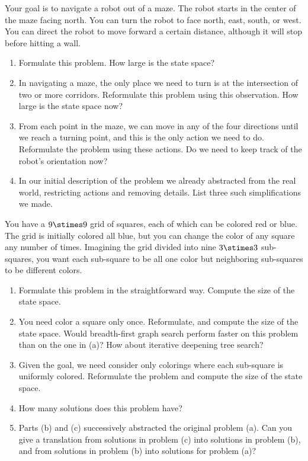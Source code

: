 \begin{uexercise}%
Your goal is to navigate a robot out of a maze.  The robot starts in
the center of the maze facing north.  You can turn the robot to face
north, east, south, or west.  You can direct the robot to move forward
a certain distance, although it will stop before hitting a wall. 
\begin{enumerate}
\item Formulate this problem.  How large is the state space?

\item In navigating a maze, the only place we need to turn is at the
  intersection of two or more corridors.  Reformulate this problem
  using this observation.  How large is the state space now? 

\item From each point in the maze, we can move in any of the four
  directions until we reach a turning point, and this is the only
  action we need to do.  Reformulate the problem using these actions.
  Do we need to keep track of the robot's orientation now? 

\item In our initial description of the problem we already abstracted
  from the real world, restricting actions and removing
  details.  List three such simplifications we made. 
\end{enumerate}
\end{uexercise} 

\begin{iexercise}%
You have a \(9 \stimes 9\) grid of squares, each of which can be
colored red or blue.  The grid is initially colored all blue, but you
can change the color of any square any number of times.  Imagining the
grid divided into nine \(3 \stimes 3\) sub-squares, you want each
sub-square to be all one color but neighboring sub-squares to be
different colors. 
\begin{enumerate}
\item Formulate this problem in the straightforward way.  Compute the
  size of the state space. 

\item You need color a square only once.  Reformulate, and compute the
  size of the state space.  Would breadth-first graph search perform
  faster on this problem than on the one in (a)?  How about
  iterative deepening tree search? 

\item Given the goal, we need consider only colorings where each
  sub-square is uniformly colored.  Reformulate the problem and
  compute the size of the state space. 

\item How many solutions does this problem have?

\item Parts (b) and (c) successively abstracted the original problem
  (a).  Can you give a translation from solutions in problem (c) into
  solutions in problem (b), and from solutions in problem (b) into
  solutions for problem (a)? 
\end{enumerate}
\end{iexercise} 

